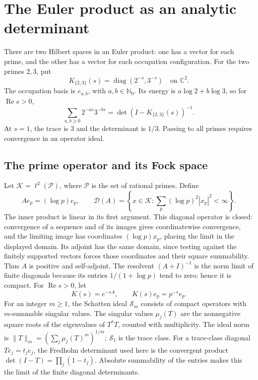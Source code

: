 \section{The Euler product as an analytic determinant}
\label{sec:euler-det}

There are two Hilbert spaces in an Euler product: one has a vector for
each prime, and the other has a vector for each occupation configuration.
For the two primes \(2,3\), put
\[
 K_{\{2,3\}}(s)=\operatorname{diag}(2^{-s},3^{-s})
 \quad\text{on }\mathbb C^2.
\]
The occupation basis is \(e_{a,b}\), with \(a,b\in\mathbb N_0\).
Its energy is \(a\log2+b\log3\), so for \(\operatorname{Re}s>0\),
\[
 \sum_{a,b\geq0}2^{-as}3^{-bs}
 =\det(I-K_{\{2,3\}}(s))^{-1}.
\]
At \(s=1\), the trace is \(3\) and the determinant is \(1/3\).
Passing to all primes requires convergence in an operator ideal.

\subsection{The prime operator and its Fock space}

Let \(\mathscr K=\ell^2(\mathcal P)\), where \(\mathcal P\) is the set
of rational primes.  Define
\[
 Ae_p=(\log p)e_p,\qquad
 \mathcal D(A)=\left\{x\in\mathscr K:
 \sum_p(\log p)^2|x_p|^2<\infty\right\}.
\]
The inner product is linear in its first argument.  This diagonal
operator is closed: convergence of a sequence and of its images gives
coordinatewise convergence, and the limiting image has coordinates
\((\log p)x_p\), placing the limit in the displayed domain.
Its adjoint has the same domain, since testing against the finitely
supported vectors forces those coordinates and their square summability.
Thus \(A\) is positive and self-adjoint.  The resolvent
\((A+I)^{-1}\) is the norm limit of finite diagonals because its
entries \(1/(1+\log p)\) tend to zero; hence it is compact.
For \(\operatorname{Re}s>0\), let
\[
 K(s)=e^{-sA},\qquad K(s)e_p=p^{-s}e_p.
\]
For an integer \(m\geq1\), the Schatten ideal \(\mathcal S_m\) consists
of compact operators with \(m\)-summable singular values.  The singular
values \(\mu_j(T)\) are the nonnegative square roots of the eigenvalues
of \(T^*T\), counted with multiplicity.  The ideal norm is
\(\|T\|_m=(\sum_j\mu_j(T)^m)^{1/m}\); \(\mathcal S_1\) is the
trace class.  For a trace-class diagonal \(Te_j=t_je_j\), the
Fredholm determinant used here is the convergent product
\(\det(I-T)=\prod_j(1-t_j)\).  Absolute summability of the entries
makes this the limit of the finite diagonal determinants.

